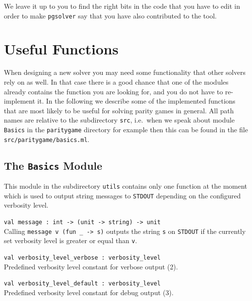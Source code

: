 We leave it up to you to find the right bits in the code that you have to edit in order to make
\texttt{pgsolver} say that you have also contributed to the tool.



\section{Useful Functions}

When designing a new solver you may need some functionality that other solvers rely on as well. In that
case there is a good chance that one of the modules already contains the function you are looking for,
and you do not have to re-implement it. In the following we describe some of the implemented functions
that are most likely to be useful for solving parity games in general. All path names are relative to
the subdirectory \texttt{src}, i.e.\ when we speak about module \texttt{Basics} in the \texttt{paritygame}
directory for example then this can be found in the file \texttt{src/paritygame/basics.ml}.

\subsection{The {\tt Basics} Module}

This module in the subdirectory \texttt{utils} contains only one function at the moment which is used to
output string messages to \texttt{STDOUT} depending on the configured verbosity level.

\begin{description}
\itemsep3mm
\item \verb+val message : int -> (unit -> string) -> unit+ \ \\
Calling \verb+message v (fun _ -> s)+ outputs the string \verb+s+ on \texttt{STDOUT} if the currently
set verbosity level is greater or equal than \verb+v+.

\item \verb+val verbosity_level_verbose : verbosity_level+ \ \\
Predefined verbosity level constant for verbose output (2).

\item \verb+val verbosity_level_default : verbosity_level+ \ \\
Predefined verbosity level constant for debug output (3).
\end{description}


